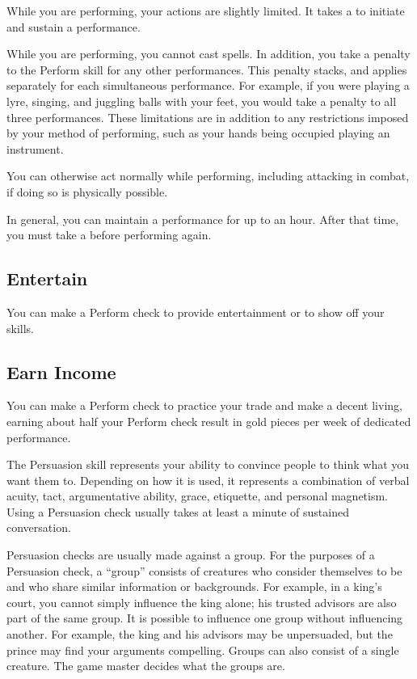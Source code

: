         While you are performing, your actions are slightly limited.
        It takes a  to initiate and sustain a performance.

        While you are performing, you cannot cast spells.
        In addition, you take a  penalty to the Perform skill for any other performances.
        This penalty stacks, and applies separately for each simultaneous performance.
        For example, if you were playing a lyre, singing, and juggling balls with your feet, you would take a  penalty to all three performances.
        These limitations are in addition to any restrictions imposed by your method of performing, such as your hands being occupied playing an instrument.

        You can otherwise act normally while performing, including attacking in combat, if doing so is physically possible.

        In general, you can maintain a performance for up to an hour.
        After that time, you must take a  before performing again.

    \subsection{Entertain}
        You can make a Perform check to provide entertainment or to show off your skills.

    \subsection{Earn Income}
        You can make a Perform check to practice your trade and make a decent living, earning about half your Perform check result in gold pieces per week of dedicated performance.

\newpage
{}
        The Persuasion skill represents your ability to convince people to think what you want them to.
        Depending on how it is used, it represents a combination of verbal acuity, tact, argumentative ability, grace, etiquette, and personal magnetism.
        Using a Persuasion check usually takes at least a minute of sustained conversation.

        Persuasion checks are usually made against a group. For the purposes of a Persuasion check, a ``group'' consists of creatures who consider themselves to be  and who share similar information or backgrounds. For example, in a king's court, you cannot simply influence the king alone; his trusted advisors are also part of the same group. It is possible to influence one group without influencing another. For example, the king and his advisors may be unpersuaded, but the prince may find your arguments compelling. Groups can also consist of a single creature. The game master decides what the groups are.

